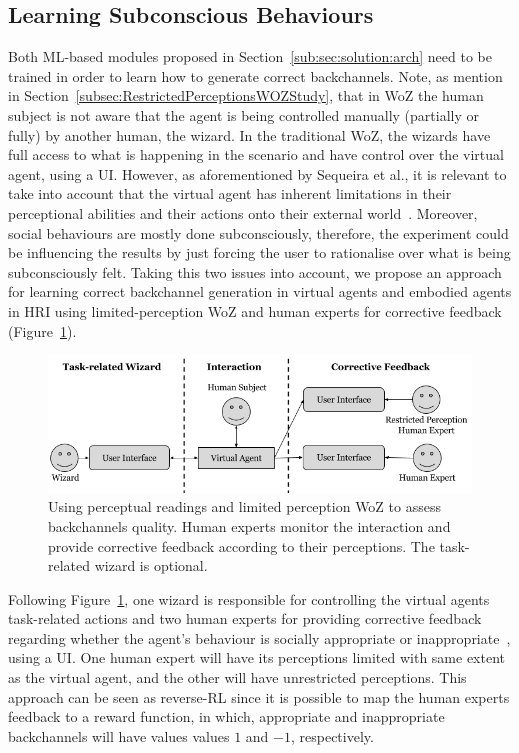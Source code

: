 \subsection{Learning Subconscious Behaviours}
\label{sub:sec:solution:WoZ}

Both \ac{ML}-based modules proposed in Section~\ref{sub:sec:solution:arch} need to be trained in order to learn how to generate correct backchannels. Note, as mention in Section~\ref{subsec:RestrictedPerceptionsWOZStudy}, that in \ac{WoZ} the human subject is not aware that the agent is being controlled manually (partially or fully) by another human, the wizard. In the traditional \ac{WoZ}, the wizards have full access to what is happening in the scenario and have control over the virtual agent, using a \ac{UI}. However, as aforementioned by Sequeira et al., it is relevant to take into account that the virtual agent has inherent limitations in their perceptional abilities and their actions onto their external world~\cite{Sequeira2016}. Moreover, social behaviours are mostly done subconsciously, therefore, the experiment could be influencing the results by just forcing the user to rationalise over what is being subconsciously felt. Taking this two issues into account, we propose an approach for learning correct backchannel generation in virtual agents and embodied agents in \ac{HRI} using limited-perception \ac{WoZ} and human experts for corrective feedback (Figure~\ref{fig:learning:process}).



\begin{figure}
	\centering
	\includegraphics[width=\textwidth]{images/CorrectiveFeedbackRestrictiveWoZ_Diagram.png}
	\caption{Using perceptual readings and limited perception \ac{WoZ} to assess backchannels quality. Human experts monitor the interaction and provide corrective feedback according to their perceptions. The task-related wizard is optional.}
	\label{fig:learning:process}
\end{figure}

Following Figure~\ref{fig:learning:process}, one wizard is responsible for controlling the virtual agents task-related actions and two human experts for providing corrective feedback regarding whether the agent's behaviour is socially appropriate or inappropriate~\cite{Kok2012, Poppe2011}, using a \ac{UI}. One human expert will have its perceptions limited with same extent as the virtual agent, and the other will have unrestricted perceptions. This approach can be seen as reverse-\ac{RL} since it is possible to map the human experts feedback to a reward function, in which, appropriate and inappropriate backchannels will have values values $1$ and $-1$, respectively.

